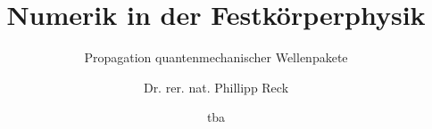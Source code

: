 \documentclass{beamer}
\begin{document}
\title{Numerik in der Festkörperphysik}
\subtitle{Propagation quantenmechanischer Wellenpakete}
\author[Phillipp Reck]{Dr. rer. nat. Phillipp Reck}
\date{tba} 


    
    





\end{document}

